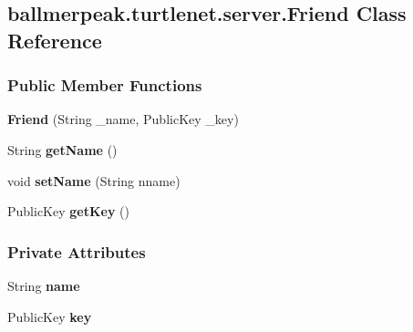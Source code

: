 \hypertarget{classballmerpeak_1_1turtlenet_1_1server_1_1Friend}{\subsection{ballmerpeak.\-turtlenet.\-server.\-Friend Class Reference}
\label{classballmerpeak_1_1turtlenet_1_1server_1_1Friend}
}
\subsubsection*{Public Member Functions}
\begin{DoxyCompactItemize}
\item 
\hypertarget{classballmerpeak_1_1turtlenet_1_1server_1_1Friend_a50e9ef8a47c46e1eea3e649e51cad734}{{\bfseries Friend} (String \-\_\-name, Public\-Key \-\_\-key)}\label{classballmerpeak_1_1turtlenet_1_1server_1_1Friend_a50e9ef8a47c46e1eea3e649e51cad734}

\item 
\hypertarget{classballmerpeak_1_1turtlenet_1_1server_1_1Friend_a9d1d463695e2067519e22fd72e755896}{String {\bfseries get\-Name} ()}\label{classballmerpeak_1_1turtlenet_1_1server_1_1Friend_a9d1d463695e2067519e22fd72e755896}

\item 
\hypertarget{classballmerpeak_1_1turtlenet_1_1server_1_1Friend_af8c55f75a45736fc7d0a811eb0d16135}{void {\bfseries set\-Name} (String nname)}\label{classballmerpeak_1_1turtlenet_1_1server_1_1Friend_af8c55f75a45736fc7d0a811eb0d16135}

\item 
\hypertarget{classballmerpeak_1_1turtlenet_1_1server_1_1Friend_a494b2f9df729538a993850f59a418d85}{Public\-Key {\bfseries get\-Key} ()}\label{classballmerpeak_1_1turtlenet_1_1server_1_1Friend_a494b2f9df729538a993850f59a418d85}

\end{DoxyCompactItemize}
\subsubsection*{Private Attributes}
\begin{DoxyCompactItemize}
\item 
\hypertarget{classballmerpeak_1_1turtlenet_1_1server_1_1Friend_a6ca8fa062fdfee5cb31da6408d33fc47}{String {\bfseries name}}\label{classballmerpeak_1_1turtlenet_1_1server_1_1Friend_a6ca8fa062fdfee5cb31da6408d33fc47}

\item 
\hypertarget{classballmerpeak_1_1turtlenet_1_1server_1_1Friend_a54977f0667cfb6c533e9e13b9684c66c}{Public\-Key {\bfseries key}}\label{classballmerpeak_1_1turtlenet_1_1server_1_1Friend_a54977f0667cfb6c533e9e13b9684c66c}

\end{DoxyCompactItemize}


